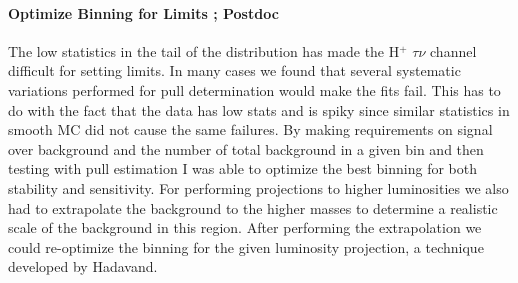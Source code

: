 
\paragraph{Optimize Binning for Limits ;  Postdoc} %
The low statistics in the tail of the distribution has made the H$^+$ \too $\tau \nu$ channel difficult for setting limits.  In many cases we found that several systematic variations performed for pull determination would make the fits fail.  
This has to do with the fact that the data has low stats and is spiky since similar statistics in smooth MC did not cause the same failures. 
By making requirements on signal over background and the number of total background in a given
bin and then testing with pull estimation I was able to optimize the best binning for both stability and sensitivity.  For performing projections to higher luminosities we also had to extrapolate the background to the higher masses
to determine a realistic scale of the background in this region. After performing the extrapolation we could re-optimize the binning for the given luminosity projection, a technique developed by Hadavand.



